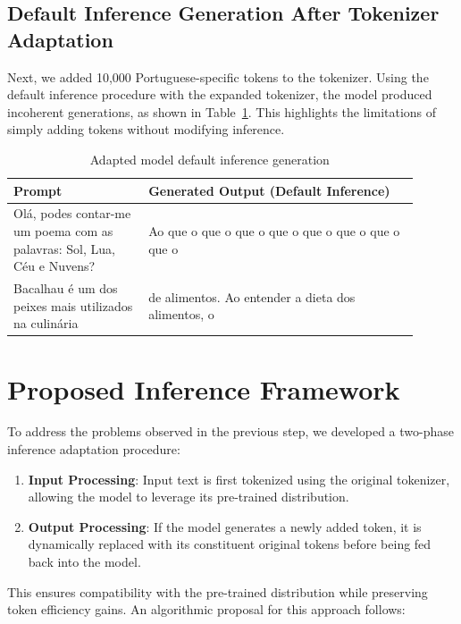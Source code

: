 \subsection{Default Inference Generation After Tokenizer Adaptation}
Next, we added 10,000 Portuguese-specific tokens to the tokenizer. Using the default inference procedure with the expanded tokenizer, the model produced incoherent generations, as shown in Table~\ref{tab:default-inference-results}. This highlights the limitations of simply adding tokens without modifying inference.

\begin{table}[H]
    \centering
    \begin{tabular}{|p{0.3\linewidth}|p{0.6\linewidth}|}
        \hline
        \textbf{Prompt} & \textbf{Generated Output (Default Inference)} \\
        \hline
        Olá, podes contar-me um poema com as palavras: Sol, Lua, Céu e Nuvens? & Ao que o que o que o que o que o que o que o que o \\
        \hline
        Bacalhau é um dos peixes mais utilizados na culinária & de alimentos. Ao entender a dieta dos alimentos, o \\
        \hline
    \end{tabular}
    \caption{Adapted model default inference generation}
    \label{tab:default-inference-results}
\end{table}

\section{Proposed Inference Framework}
To address the problems observed in the previous step, we developed a two-phase inference adaptation procedure:

\begin{enumerate}
    \item \textbf{Input Processing}: Input text is first tokenized using the original tokenizer, allowing the model to leverage its pre-trained distribution.
    \item \textbf{Output Processing}: If the model generates a newly added token, it is dynamically replaced with its constituent original tokens before being fed back into the model.
\end{enumerate}

This ensures compatibility with the pre-trained distribution while preserving token efficiency gains. An algorithmic proposal for this approach follows:


